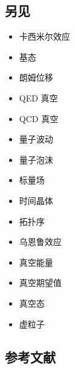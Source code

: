 \subsection{另见}
\begin{itemize}
\item 卡西米尔效应 
\item 基态 
\item 朗姆位移  
\item QED 真空  
\item QCD 真空  
\item 量子波动  
\item 量子泡沫 
\item 标量场  
\item 时间晶体 
\item 拓扑序  
\item 乌恩鲁效应  
\item 真空能量  
\item 真空期望值  
\item 真空态 
\item 虚粒子  
\end{itemize}
\subsection{参考文献} 

